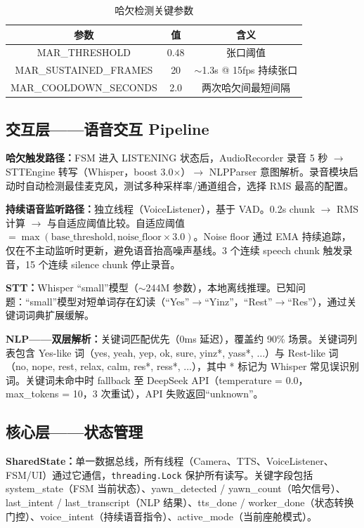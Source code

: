 \documentclass[12pt,a4paper]{ctexart}
\begin{document}
\begin{table}[htbp]
\centering
\caption{哈欠检测关键参数}
\begin{tabular}{@{}ccc@{}}
\toprule
\textbf{参数} & \textbf{值} & \textbf{含义} \\
\midrule
MAR\_THRESHOLD        & 0.48 & 张口阈值 \\
MAR\_SUSTAINED\_FRAMES & 20   & $\sim$1.3s @ 15fps 持续张口 \\
MAR\_COOLDOWN\_SECONDS & 2.0  & 两次哈欠间最短间隔 \\
\bottomrule
\end{tabular}
\end{table}

\subsection{交互层——语音交互 Pipeline}

\textbf{哈欠触发路径：}FSM 进入 LISTENING 状态后，AudioRecorder 录音 5 秒 $\rightarrow$ STTEngine 转写（Whisper，boost 3.0$\times$）$\rightarrow$ NLPParser 意图解析。录音模块启动时自动检测最佳麦克风，测试多种采样率/通道组合，选择 RMS 最高的配置。

\textbf{持续语音监听路径：}独立线程（VoiceListener），基于 VAD。0.2s chunk $\rightarrow$ RMS 计算 $\rightarrow$ 与自适应阈值比较。自适应阈值 $= \max(\text{base\_threshold}, \text{noise\_floor} \times 3.0)$。Noise floor 通过 EMA 持续追踪，仅在不主动监听时更新，避免语音抬高噪声基线。3 个连续 speech chunk 触发录音，15 个连续 silence chunk 停止录音。

\textbf{STT：}Whisper “small”模型（$\sim$244M 参数），本地离线推理。已知问题：“small”模型对短单词存在幻读（“Yes”$\rightarrow$“Yinz”，“Rest”$\rightarrow$“Res”），通过关键词词典扩展缓解。

\textbf{NLP——双层解析：}关键词匹配优先（0ms 延迟），覆盖约 90\% 场景。关键词列表包含 Yes-like 词（yes, yeah, yep, ok, sure, yinz*, yass*, $\dots$）与 Rest-like 词（no, nope, rest, relax, calm, res*, ress*, $\dots$），其中 * 标记为 Whisper 常见误识别词。关键词未命中时 fallback 至 DeepSeek API（temperature = 0.0，max\_tokens = 10，3 次重试），API 失败返回“unknown”。

\subsection{核心层——状态管理}

\textbf{SharedState：}单一数据总线，所有线程（Camera、TTS、VoiceListener、FSM/UI）通过它通信，\texttt{threading.Lock} 保护所有读写。关键字段包括 system\_state（FSM 当前状态）、yawn\_detected / yawn\_count（哈欠信号）、last\_intent / last\_transcript（NLP 结果）、tts\_done / worker\_done（状态转换门控）、voice\_intent（持续语音指令）、active\_mode（当前座舱模式）。
\end{document}
